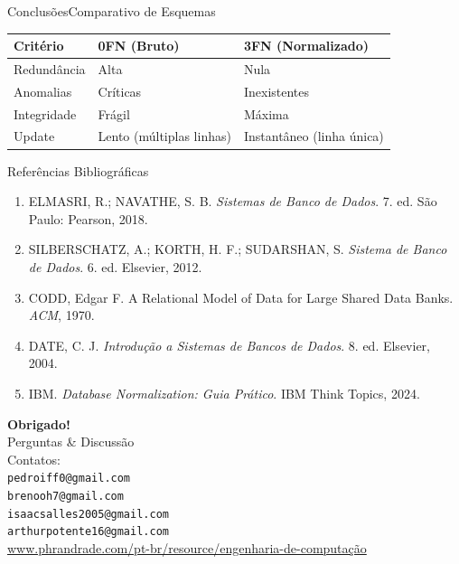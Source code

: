 \documentclass[10pt,aspectratio=169]{beamer}
\begin{document}
\begin{frame}{Conclusões}{Comparativo de Esquemas}
  \begin{table}
    \centering
    \small
    \begin{tabular}{>{\raggedright}p{} >{\centering}p{} >{\centering\arraybackslash}p{}}
      \toprule
      \textbf{Critério} & \textbf{0FN (Bruto)} & \textbf{3FN (Normalizado)} \\
      \midrule
      Redundância & Alta & Nula \\
      Anomalias & Críticas & Inexistentes \\
      Integridade & Frágil & Máxima \\
      Update & Lento (múltiplas linhas) & Instantâneo (linha única) \\
      \bottomrule
    \end{tabular}
  \end{table}
\end{frame}

\begin{frame}{Referências Bibliográficas}
  \footnotesize
  \begin{enumerate}
    \item ELMASRI, R.; NAVATHE, S. B. \textit{Sistemas de Banco de Dados}. 7. ed. São Paulo: Pearson, 2018.
    \item SILBERSCHATZ, A.; KORTH, H. F.; SUDARSHAN, S. \textit{Sistema de Banco de Dados}. 6. ed. Elsevier, 2012.
    \item CODD, Edgar F. A Relational Model of Data for Large Shared Data Banks. \textit{ACM}, 1970.
    \item DATE, C. J. \textit{Introdução a Sistemas de Bancos de Dados}. 8. ed. Elsevier, 2004.
    \item IBM. \textit{Database Normalization: Guia Prático}. IBM Think Topics, 2024.
  \end{enumerate}
\end{frame}

\begin{frame}{}
  \centering
  \vspace{1.5cm}
  {\Huge \textbf{Obrigado!}}\\[0.5cm]
  {\large Perguntas \& Discussão}\\[1cm]
  \normalsize
  Contatos:\\
  \texttt{pedroiff0@gmail.com}\\
  \texttt{brenooh7@gmail.com}\\
  \texttt{isaacsalles2005@gmail.com}\\
  \texttt{arthurpotente16@gmail.com}\\[0.5cm]
  \small
  \url{www.phrandrade.com/pt-br/resource/engenharia-de-computação}
\end{frame}
\end{document}
